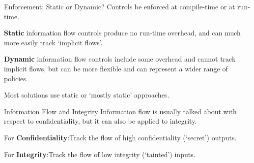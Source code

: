 \begin{frame}{Enforcement: Static or Dynamic?}
	Controls be enforced at compile-time or at run-time.
	
	\textbf{Static} information flow controls produce no run-time overhead, and can much more easily track `implicit flows'.
	
	\textbf{Dynamic} information flow controls include some overhead and cannot track implicit flows, but can be more flexible and can represent a wider range of policies.
	
	Most solutions use static or `mostly static' approaches.
\end{frame}

\begin{frame}{Information Flow and Integrity}
	Information flow is usually talked about with respect to confidentiality, but it can also be applied to integrity.
	
	For \textbf{Confidentiality}:\newline Track the flow of high confidentiality (`secret') outputs.
	
	For \textbf{Integrity}:\newline Track the flow of low integrity (`tainted') inputs.
\end{frame}